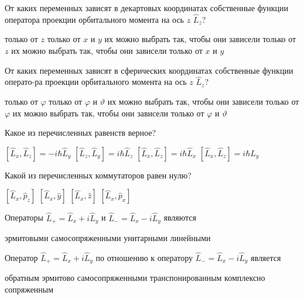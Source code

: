 \documentclass[11pt,a4paper]{exam}
\begin{document}
\begin{questions}
\question От каких переменных зависят в декартовых координатах собственные функции оператора проекции орбитального момента на ось $z$ ${\hat L_z}$?
\begin{choices}
\choice только от $z$
\choice только от $x$ и $y$
\choice их можно выбрать так, чтобы они зависели только от $z$
\choice их можно выбрать так, чтобы они зависели только от $x$ и $y$
\end{choices}

\question От каких переменных зависят в сферических координатах собственные функции операто-ра проекции орбитального момента на ось $z$ ${\hat L_z}$?
\begin{choices}
\choice только от $\varphi $
\choice только от $\varphi $ и $\vartheta $
\choice их можно выбрать так, чтобы они зависели только от $\varphi $
\choice их можно выбрать так, чтобы они зависели только от $\varphi $ и $\vartheta $
\end{choices}

\question Какое из перечисленных равенств верное?
\begin{choices}
\choice $\left[ {{{\hat L}_x},{{\hat L}_z}} \right] =  - i\hbar {\hat L_y}$     
\choice $\left[ {{{\hat L}_z},{{\hat L}_y}} \right] = i\hbar {\hat L_z}$     
\choice $\left[ {{{\hat L}_x},{{\hat L}_z}} \right] = i\hbar {\hat L_x}$  
\choice $\left[ {{{\hat L}_x},{{\hat L}_z}} \right] = i\hbar {L_y}$
\end{choices}

\question Какой из перечисленных коммутаторов равен нулю?
\begin{choices}
\choice $\left[ {{{\hat L}_x},{{\hat p}_z}} \right]$    
\choice $\left[ {{{\hat L}_x},\hat y} \right]$    
\choice $\left[ {{{\hat L}_x},\hat z} \right]$    
\choice $\left[ {{{\hat L}_x},{{\hat p}_x}} \right]$
\end{choices}

\question Операторы ${\hat L_ + } = {\hat L_x} + i{\hat L_y}$ и ${\hat L_ - } = {\hat L_x} - i{\hat L_y}$ являются
\begin{choices}
\choice эрмитовыми  
\choice самосопряженными  
\choice унитарными  
\choice линейными
\end{choices}

\question Оператор ${\hat L_ + } = {\hat L_x} + i{\hat L_y}$ по отношению к оператору ${\hat L_ - } = {\hat L_x} - i{\hat L_y}$ является 
\begin{choices}
\choice обратным       
\choice эрмитово самосопряженными
\choice транспонированным 
\choice комплексно сопряженным
\end{choices}


\end{questions}
\end{document}
